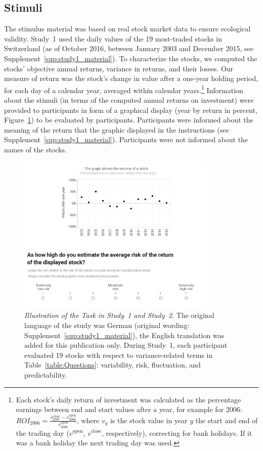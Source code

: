 \documentclass[a4paper,man, natbib,floatsintext]{apa6} %
\begin{document}
\subsection{Stimuli}
The stimulus material was based on real stock market data to ensure ecological validity. Study~1 used the daily values of the 19 most-traded  stocks in Switzerland (as of October 2016, between January 2003 and December 2015, see Supplement~\ref{sup:study1_material}). To characterize the stocks, we computed the stocks' objective annual returns, variance in returns, and their losses. Our  measure of return was the stock's change in value after a one-year holding period, for each day of a calendar year, averaged within calendar years.\footnote{Each stock's daily return of investment was calculated as the percentage earnings between end and start values after a year, for example for 2006: $ROI_{2006} = \frac{v_{2007}^{\text{close}} - v_{2006}^{\text{open}}}{v_{2006}^{\text{open}}}$, where $v_y$ is the stock value in year $y$ the start and end of the trading day ($v^{\text{open}}$, $v^{\text{close}}$, respectively), correcting for bank holidays. If it was a bank holiday the next trading day was used.}
Information about the stimuli (in terms of the computed annual returns on investment) were provided to participants in form of a graphical display (year by return in percent, Figure~\ref{fig:study1_material}) to be evaluated by participants. Participants were informed about the meaning of the return that the graphic displayed in the instructions (see Supplement~\ref{sup:study1_material}). Participants were not informed about the names of the stocks.

\begin{figure}[h!] \centering
    \includegraphics[width=0.85\textwidth]{fig1}
    \caption{\textit{Illustration of the Task in Study~1 and Study~2.} The original language of the study was German  (original wording: Supplement~\ref{sup:study1_material}), the English translation was added for this publication only. During Study~1, each participant evaluated 19 stocks with respect to variance-related terms in Table~\ref{table:Questions}: variability, risk, fluctuation, and predictability.}
    \label{fig:study1_material}
\end{figure}
\end{document}
